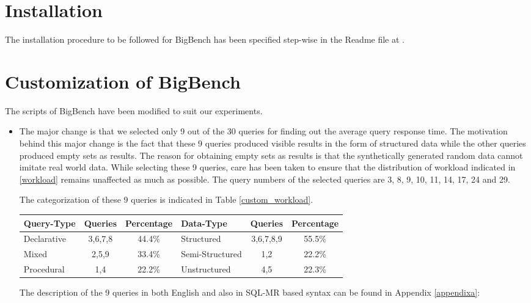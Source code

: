 \documentclass[12pt]{book}
\begin{document}
\section{Installation}
The installation procedure to be followed for BigBench has been specified step-wise in the Readme file at \cite{bigbenchgit}.

\section{Customization of BigBench}
The scripts of BigBench have been modified to suit our experiments.
\newline
\begin{itemize}
 \item The major change is that we selected only 9 out of the 30 queries for finding out the average query response time. 
The motivation behind this major change is the fact that these 9 queries produced visible results in the form of structured data while 
the other queries produced empty sets as results. The reason for obtaining empty sets as results is that the synthetically generated
random data cannot imitate real world data. 
\newline
\newline
While selecting these 9 queries, care has been taken to ensure that the distribution of workload indicated in \ref{workload}
remains unaffected as much as possible. The query numbers of the selected queries are 3, 8, 9, 10, 11, 14, 17, 24 and 29.

The categorization of these 9 queries is indicated in Table \ref{custom_workload}.
\begin{center}
\begin{tabular}{|l|c|c||l|c|c|}\hline
Query-Type & Queries & Percentage & Data-Type & Queries & Percentage\\\hline
\multirow{2}{*}{Declarative} & \multirow{2}{*}{3,6,7,8} & \multirow{2}{*}{44.4\%} & \multirow{2}{*}{Structured} & \multirow{2}{*}{3,6,7,8,9} & \multirow{2}{*}{55.5\%}\\
& & & & & \\\hline
\multirow{2}{*}{Mixed} & \multirow{2}{*}{2,5,9} & \multirow{2}{*}{33.4\%} & \multirow{2}{*}{Semi-Structured} & \multirow{2}{*}{1,2} & \multirow{2}{*}{22.2\%}\\
& & & & & \\\hline
\multirow{2}{*}{Procedural} & \multirow{2}{*}{1,4} & \multirow{2}{*}{22.2\%} & \multirow{2}{*}{Unstructured} & \multirow{2}{*}{4,5} & \multirow{2}{*}{22.3\%}\\
& & & & & \\\hline
\end{tabular}
\end{center}
The description of the 9 queries in both English and also in SQL-MR based syntax can be found in Appendix \ref{appendixa}:



\end{itemize}
\end{document}
